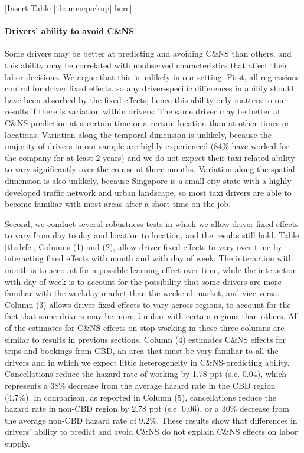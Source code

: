 \documentclass[reviewmode,AEJ]{AEA}
\begin{document}
\begin{center}
    [Insert Table \ref{tb:immepickup} here]
\end{center}

\paragraph{Drivers' ability to avoid C\&NS} Some drivers may be better at predicting and avoiding C\&NS 
than others, and this ability may be correlated with unobserved characteristics that affect their labor 
decisions. We argue that this is unlikely in our setting. First, all regressions control for driver fixed
effects, so any driver-specific differences in ability should have been absorbed by the fixed effects;
hence this ability only matters to our results if there is variation within drivers: The same driver may 
be better at C\&NS prediction at a certain time or a certain location than at other times or locations. 
Variation along the temporal dimension is unlikely, because the majority of drivers in our sample are highly
experienced (84\% have worked for the company for at least 2 years) and we do not expect their taxi-related
ability to vary significantly over the course of three months. Variation along the spatial dimension is also
unlikely, because Singapore is a small city-state with a highly developed traffic network and urban landscape,
so most taxi drivers are able to become familiar with most areas after a short time on the job. 

Second, we conduct several robustness tests in which we allow driver fixed effects to vary from day to day 
and location to location, and the results still hold. Table  \ref{tb:drfe}, Columns (1) and (2), allow driver
fixed effects to vary over time by interacting fixed effects with month and with day of week. The interaction
with month is to account for a possible learning effect over time, while the interaction with day of week is
to account for the possibility that some drivers are more familiar with the weekday market than the weekend
market, and vice versa. Column (3) allows driver fixed effects to vary across regions, to account for the fact 
that some drivers may be more familiar with certain regions than others. All of the estimates for C\&NS effects
on stop working in these three columns are %
similar to results in previous sections. Column (4) estimates C\&NS effects for trips and bookings from CBD, 
an area that must be very familiar to all the drivers and in which we expect little heterogeneity in
C\&NS-predicting ability. Cancellations reduce the hazard rate of working by 1.78 ppt (s.e. 0.04), which 
represents a 38\% decrease from the average hazard rate in the CBD region (4.7\%). In comparison, as
reported in Column (5), cancellations reduce the hazard rate in non-CBD region by 2.78 ppt (s.e. 0.06), 
or a 30\% decrease from the average non-CBD hazard rate of 9.2\%. These results show that differences in
drivers' ability to predict and avoid C\&NS do not explain C\&NS effects on labor supply.
\end{document}
